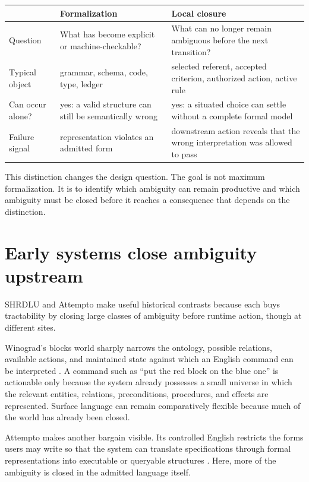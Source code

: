 \documentclass[11pt]{article}
\begin{document}
\begin{center}
\small
\begin{tabular}{>{\raggedright\arraybackslash}p{} >{\raggedright\arraybackslash}p{} >{\raggedright\arraybackslash}p{}}
\toprule
 & Formalization & Local closure \\
\midrule
Question & What has become explicit or machine-checkable? & What can no longer remain ambiguous before the next transition? \\
Typical object & grammar, schema, code, type, ledger & selected referent, accepted criterion, authorized action, active rule \\
Can occur alone? & yes: a valid structure can still be semantically wrong & yes: a situated choice can settle without a complete formal model \\
Failure signal & representation violates an admitted form & downstream action reveals that the wrong interpretation was allowed to pass \\
\bottomrule
\end{tabular}
\end{center}

This distinction changes the design question. The goal is not maximum formalization. It is to identify which ambiguity can remain productive and which ambiguity must be closed before it reaches a consequence that depends on the distinction.

\section{Early systems close ambiguity upstream}
SHRDLU and Attempto make useful historical contrasts because each buys tractability by closing large classes of ambiguity before runtime action, though at different sites.

Winograd's blocks world sharply narrows the ontology, possible relations, available actions, and maintained state against which an English command can be interpreted \parencite{winograd1973procedural}. A command such as ``put the red block on the blue one'' is actionable only because the system already possesses a small universe in which the relevant entities, relations, preconditions, procedures, and effects are represented. Surface language can remain comparatively flexible because much of the world has already been closed.

Attempto makes another bargain visible. Its controlled English restricts the forms users may write so that the system can translate specifications through formal representations into executable or queryable structures \parencite{fuchs1996ace}. Here, more of the ambiguity is closed in the admitted language itself.
\end{document}

